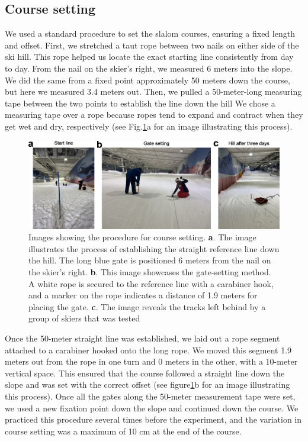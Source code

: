 \documentclass[pdflatex,sn-mathphys-num]{sn-jnl}%
\theoremstyle{thmstyleone}%
\theoremstyle{thmstyletwo}%
\theoremstyle{thmstylethree}%
\begin{document}
\begin{appendices}
\section{Course setting}\label{sup_coursesetting}
We used a standard procedure to set the slalom courses, ensuring a fixed length and offset. First, we stretched a taut rope between two nails on either side of the ski hill. This rope helped us locate the exact starting line consistently from day to day. From the nail on the skier's right, we measured 6 meters into the slope. We did the same from a fixed point approximately 50 meters down the course, but here we measured 3.4 meters out. Then, we pulled a 50-meter-long measuring tape between the two points to establish the line down the hill   We chose a measuring tape over a rope because ropes tend to expand and contract when they get wet and dry, respectively (see Fig.\ref{fig:coursesetting}a for an image illustrating this process).

\begin{figure}[H]
\centering
\includegraphics[width=\linewidth]{figures/figure_appendix_coursesetting.jpg}
\caption{Images showing the procedure for course setting. \textbf{a}. The image illustrates the process of establishing the straight reference line down the hill. The long blue gate is positioned 6 meters from the nail on the skier's right. \textbf{b}. This image showcases the gate-setting method. A white rope is secured to the reference line with a carabiner hook, and a marker on the rope indicates a distance of 1.9 meters for placing the gate. \textbf{c}. The image reveals the tracks left behind by a group of skiers that was tested
}
\label{fig:coursesetting}
\end{figure}
 

Once the 50-meter straight line was established, we laid out a rope segment attached to a carabiner hooked onto the long rope. We moved this segment 1.9 meters out from the rope in one turn and 0 meters in the other, with a 10-meter vertical space. This ensured that the course followed a straight line down the slope and was set with the correct offset (see figure\ref{fig:coursesetting}b for an image illustrating this process). Once all the gates along the 50-meter measurement tape were set, we used a new fixation point down the slope and continued down the course. We practiced this procedure several times before the experiment, and the variation in course setting was a maximum of 10 cm at the end of the course.


\end{appendices}
\end{document}
